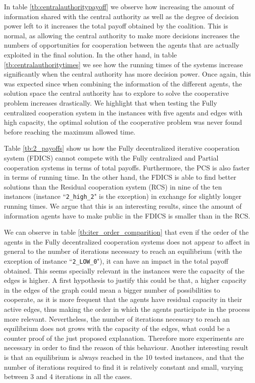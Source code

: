 \documentclass{article}
\begin{document}
In table \ref{tb:centralauthoritypayoff} we observe how increasing the amount of information shared with the central authority as well as the degree of decision power left to it increases the total payoff obtained by the coalition. This is normal, as allowing the central authority to make more decisions increases the numbers of opportunities for cooperation between the agents that are actually exploited in the final solution. In the other hand, in table \ref{tb:centralauthoritytimes} we see how the running times of the systems increase significantly when the central authority has more decision power. Once again, this was expected since when combining the information of the different agents, the solution space the central authority has to explore to solve the cooperative problem increases drastically. We highlight that when testing the Fully centralized cooperation system in the instances with five agents and edges with high capacity, the optimal solution of the cooperative problem was never found before reaching the maximum allowed time.

Table \ref{tb:2_payoffs} show us how the Fully decentralized iterative cooperation system (FDICS) cannot compete with  the Fully centralized and Partial cooperation systems in terms of total payoffs. Furthermore, the PCS is also faster in terms of running time. In the other hand, the FDICS is able to find better solutions than the Residual cooperation system (RCS) in nine of the ten instances (instance ``\texttt{2\_high\_2}" is the exception) in exchange for slightly longer running times. We argue that this is an interesting results, since the amount of information agents have to make public in the FDICS is smaller than in the RCS.

We can observe in table \ref{tb:iter_order_comparition} that even if the order of the agents in the Fully decentralized cooperation systems does not appear to affect in general to the number of iterations necessary to reach an equilibrium (with the exception of instance ``\texttt{2\_LOW\_0}"), it can have an impact in the total payoff obtained. This seems specially relevant in the instances were the capacity of the edges is higher. A first hypothesis to justify this could be that, a higher capacity in the edges of the graph could mean a bigger number of possibilities to cooperate, as it is more frequent that the agents have residual capacity in their active edges, thus making the order in which the agents participate in the process more relevant. Nevertheless, the number of iterations necessary to reach an equilibrium does not grows with the capacity of the edges, what could be a counter proof of the just proposed explanation. Therefore more experiments are necessary in order to find the reason of this behaviour.  Another interesting result is that an equilibrium is always reached in the 10 tested instances, and that the number of iterations required to find it is relatively constant and small, varying between 3 and 4 iterations in all the cases.
\end{document}
